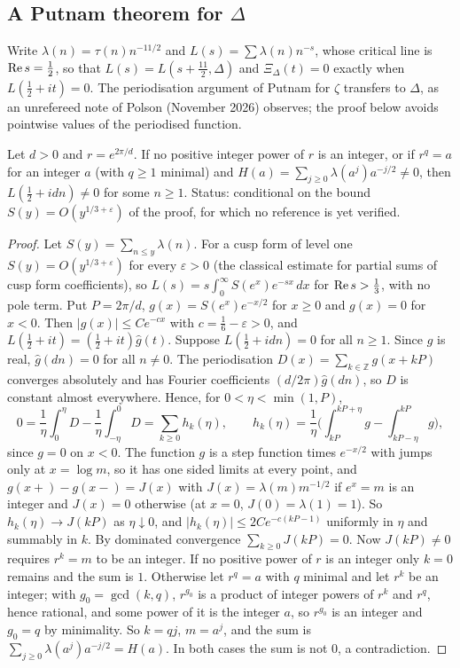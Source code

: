 \subsection{A Putnam theorem for \texorpdfstring{$\Delta$}{Delta}}\label{dl:sec:putnam}

Write $\lambda(n)=\tau(n)n^{-11/2}$ and $L(s)=\sum\lambda(n)n^{-s}$, whose critical line is $\operatorname{Re} s=\frac12$, so that $L(s)=L(s+\frac{11}2,\Delta)$ and $\Xi_\Delta(t)=0$ exactly when $L(\frac12+it)=0$. The periodisation argument of Putnam for $\zeta$ transfers to $\Delta$, as an unrefereed note of Polson (November 2026) observes; the proof below avoids pointwise values of the periodised function.

\begin{theorem}\label{dl:thm:putnam}
Let $d>0$ and $r=e^{2\pi/d}$. If no positive integer power of $r$ is an integer, or if $r^q=a$ for an integer $a$ (with $q\ge1$ minimal) and $H(a)=\sum_{j\ge0}\lambda(a^j)a^{-j/2}\ne0$, then $L(\frac12+idn)\ne0$ for some $n\ge1$. Status: conditional on the bound $S(y)=O(y^{1/3+\varepsilon})$ of the proof, for which no reference is yet verified.
\end{theorem}

\begin{proof}
Let $S(y)=\sum_{n\le y}\lambda(n)$. For a cusp form of level one $S(y)=O(y^{1/3+\varepsilon})$ for every $\varepsilon>0$ (the classical estimate for partial sums of cusp form coefficients), %
so $L(s)=s\int_0^\infty S(e^x)e^{-sx}\,dx$ for $\operatorname{Re} s>\frac13$, with no pole term. Put $P=2\pi/d$, $g(x)=S(e^x)e^{-x/2}$ for $x\ge0$ and $g(x)=0$ for $x<0$. Then $|g(x)|\le Ce^{-cx}$ with $c=\frac16-\varepsilon>0$, and $L(\frac12+it)=(\frac12+it)\hat g(t)$. Suppose $L(\frac12+idn)=0$ for all $n\ge1$. Since $g$ is real, $\hat g(dn)=0$ for all $n\ne0$. The periodisation $D(x)=\sum_{k\in\mathbb Z}g(x+kP)$ converges absolutely and has Fourier coefficients $(d/2\pi)\hat g(dn)$, so $D$ is constant almost everywhere. Hence, for $0<\eta<\min(1,P)$,
\[
0=\frac1\eta\int_0^\eta D-\frac1\eta\int_{-\eta}^0D=\sum_{k\ge0}h_k(\eta),\qquad h_k(\eta)=\frac1\eta\Big(\int_{kP}^{kP+\eta}g-\int_{kP-\eta}^{kP}g\Big),
\]
since $g=0$ on $x<0$. The function $g$ is a step function times $e^{-x/2}$ with jumps only at $x=\log m$, so it has one sided limits at every point, and $g(x+)-g(x-)=J(x)$ with $J(x)=\lambda(m)m^{-1/2}$ if $e^x=m$ is an integer and $J(x)=0$ otherwise (at $x=0$, $J(0)=\lambda(1)=1$). So $h_k(\eta)\to J(kP)$ as $\eta\downarrow0$, and $|h_k(\eta)|\le2Ce^{-c(kP-1)}$ uniformly in $\eta$ and summably in $k$. By dominated convergence $\sum_{k\ge0}J(kP)=0$. Now $J(kP)\ne0$ requires $r^k=m$ to be an integer. If no positive power of $r$ is an integer only $k=0$ remains and the sum is $1$. Otherwise let $r^q=a$ with $q$ minimal and let $r^k$ be an integer; with $g_0=\gcd(k,q)$, $r^{g_0}$ is a product of integer powers of $r^k$ and $r^q$, hence rational, and some power of it is the integer $a$, so $r^{g_0}$ is an integer and $g_0=q$ by minimality. So $k=qj$, $m=a^j$, and the sum is $\sum_{j\ge0}\lambda(a^j)a^{-j/2}=H(a)$. In both cases the sum is not $0$, a contradiction.
\end{proof}

